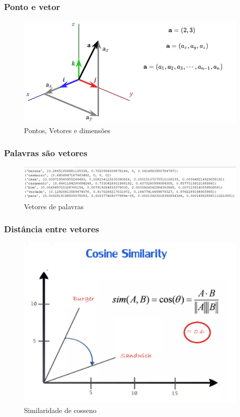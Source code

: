 \documentclass{beamer}
\begin{document}

\begin{frame}
\frametitle{Ponto e vetor}
\begin{figure}
	\centering
	\includegraphics[width=0.7\linewidth]{vector_dimensions}
	\caption[]{Pontos, Vetores e dimensões}
	\label{fig:vectordimensions}
\end{figure}

\end{frame}


\begin{frame}
\frametitle{Palavras são vetores}
\begin{figure}
	\centering
	\includegraphics[width=0.7\linewidth]{word_vectors}
	\caption{Vetores de palavras}
	\label{fig:wordvectors}
\end{figure}

\end{frame}


\begin{frame}
\frametitle{Distância entre vetores}
\begin{figure}
	\centering
	\includegraphics[width=0.7\linewidth]{cosine_sim}
	\caption{Similaridade de cosseno}
	\label{fig:cosinesim}
\end{figure}

\end{frame}
\end{document}
